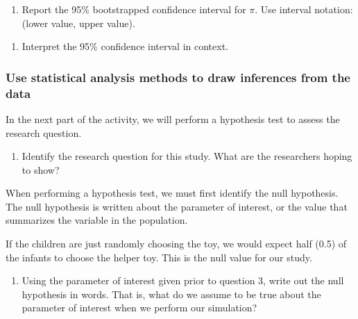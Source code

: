 \documentclass[
]{report}
\providecommand{\tightlist}{%
  \setlength{\itemsep}{0pt}\setlength{\parskip}{0pt}}
\begin{document}
\begin{enumerate}
\def\labelenumi{\arabic{enumi}.}
\setcounter{enumi}{6}
\tightlist
\item
  Report the 95\% bootstrapped confidence interval for \(\pi\). Use interval notation: (lower value, upper value).
\end{enumerate}

\vspace{0.2in}

\begin{enumerate}
\def\labelenumi{\arabic{enumi}.}
\setcounter{enumi}{7}
\tightlist
\item
  Interpret the 95\% confidence interval in context.
\end{enumerate}

\vspace{0.8in}

\hypertarget{use-statistical-analysis-methods-to-draw-inferences-from-the-data-1}{%
\subsubsection*{Use statistical analysis methods to draw inferences from the data}\label{use-statistical-analysis-methods-to-draw-inferences-from-the-data-1}}

In the next part of the activity, we will perform a hypothesis test to assess the research question.

\begin{enumerate}
\def\labelenumi{\arabic{enumi}.}
\setcounter{enumi}{8}
\tightlist
\item
  Identify the research question for this study. What are the researchers hoping to show?
\end{enumerate}

\vspace{0.6in}

When performing a hypothesis test, we must first identify the null hypothesis. The null hypothesis is written about the parameter of interest, or the value that summarizes the variable in the population.

If the children are just randomly choosing the toy, we would expect half (0.5) of the infants to choose the helper toy. This is the null value for our study.

\begin{enumerate}
\def\labelenumi{\arabic{enumi}.}
\setcounter{enumi}{9}
\tightlist
\item
  Using the parameter of interest given prior to question 3, write out the null hypothesis in words. That is, what do we assume to be true about the parameter of interest when we perform our simulation?
  \vspace{0.8in}
\end{enumerate}
\end{document}
